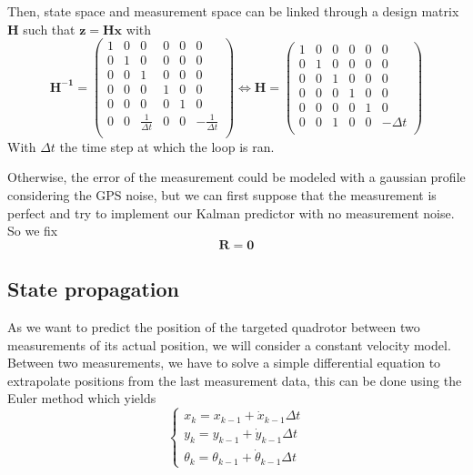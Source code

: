 \documentclass[12pt]{article}
\begin{document}
Then, state space and measurement space can be linked through a design matrix $\mathbf{H}$ such that $\mathbf{z} = \mathbf{H}\mathbf{x}$ with
\begin{equation}
\mathbf{H^{-1}} =
    \begin{pmatrix}
        1 & 0 & 0 & 0 & 0 & 0 \\
        0 & 1 & 0 & 0 & 0 & 0 \\
        0 & 0 & 1 & 0 & 0 & 0 \\
        0 & 0 & 0 & 1 & 0 & 0 \\
        0 & 0 & 0 & 0 & 1 & 0 \\
        0 & 0 & \frac{1}{\Delta{t}} & 0 & 0 & -\frac{1}{\Delta{t}} \\
    \end{pmatrix}
\iff
\mathbf{H} =
    \begin{pmatrix}
        1 & 0 & 0 & 0 & 0 & 0 \\
        0 & 1 & 0 & 0 & 0 & 0 \\
        0 & 0 & 1 & 0 & 0 & 0 \\
        0 & 0 & 0 & 1 & 0 & 0 \\
        0 & 0 & 0 & 0 & 1 & 0 \\
        0 & 0 & 1 & 0 & 0 & -\Delta{t} \\
    \end{pmatrix}
\end{equation}
With $\Delta{t}$ the time step at which the loop is ran.

Otherwise, the error of the measurement could be modeled with a gaussian profile considering the GPS noise, but we can first suppose that the measurement is perfect and try to implement our Kalman predictor with no measurement noise.
So we fix
\begin{equation}
\mathbf{R} = \mathbf{0}
\end{equation}

\subsection{State propagation}
As we want to predict the position of the targeted quadrotor between two measurements of its actual position, we will consider a constant velocity model.
Between two measurements, we have to solve a simple differential equation to extrapolate positions from the last measurement data, this can be done using the Euler method which yields
\begin{equation}
\left\{
    \begin{array}{l}
    x_k = x_{k-1} + \dot{x}_{k-1}\Delta{t} \\
    y_k = y_{k-1} + \dot{y}_{k-1}\Delta{t} \\
    \theta_k = \theta_{k-1} + \dot{\theta}_{k-1}\Delta{t}
    \end{array}
\right.
\end{equation}
\end{document}
